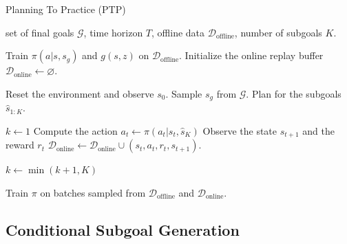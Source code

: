 \begin{algorithm}[t]
\caption{Planning To Practice (PTP)}
\begin{algorithmic}[1]
\Require set of final goals $\mathcal{G}$, time horizon $T$, offline data $\mathcal{D}_\text{offline}$, number of subgoals $K$.

\State Train $\pi(a | s, s_g)$ and $g(s, z)$ on $\mathcal{D}_\text{offline}$.
\State Initialize the online replay buffer $\mathcal{D}_\text{online} \leftarrow \varnothing$.

    \State Reset the environment and observe $s_0$.
    \State Sample $s_g$ from $\mathcal{G}$.
    \State Plan for the subgoals $\hat{s}_{1:K}$.
    
    \State $k \leftarrow 1$
        \State Compute the action $a_t \leftarrow \pi(a_t | s_t, \hat{s}_K)$
        \State Observe the state $s_{t+1}$ and the reward $r_t$
        \State $\mathcal{D}_\text{online} \leftarrow \mathcal{D}_\text{online} \cup (s_t, a_t, r_t, s_{t+1})$.
        
            \State $k \leftarrow \min(k + 1, K)$ 
        \EndIf
    \EndFor
    
    \State Train $\pi$ on batches sampled from $\mathcal{D}_\text{offline}$ and $\mathcal{D}_\text{online}$.
    
\EndWhile

\end{algorithmic}
\label{algo:ptp}
\end{algorithm}


\subsection{Conditional Subgoal Generation}

    
